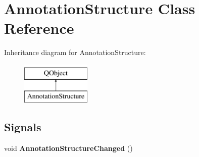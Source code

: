 \hypertarget{class_annotation_structure}{}\section{Annotation\+Structure Class Reference}
\label{class_annotation_structure}
Inheritance diagram for Annotation\+Structure\+:\begin{figure}[H]
\begin{center}
\leavevmode
\includegraphics[height=2.000000cm]{class_annotation_structure}
\end{center}
\end{figure}
\subsection*{Signals}
\begin{DoxyCompactItemize}
\item 
\mbox{\label{class_annotation_structure_a9839dc18e16b3a817e4cb3fffdfd351f}} 
void {\bfseries Annotation\+Structure\+Changed} ()
\end{DoxyCompactItemize}
